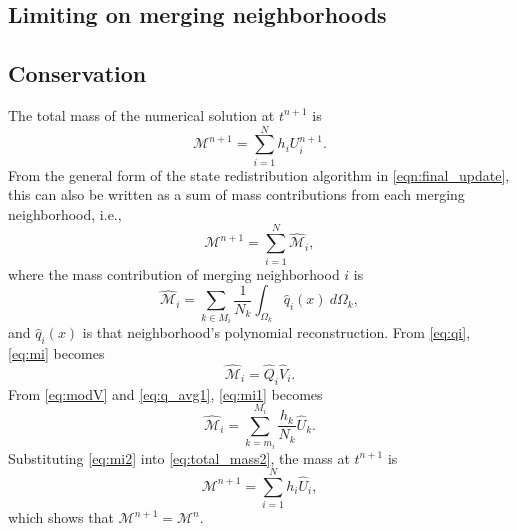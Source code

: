 \subsection{Limiting on merging neighborhoods}


\subsection{Conservation}\label{sec:cons}
The total mass of the numerical solution at $t^{n+1}$ is
\begin{equation}\label{eq:total_mass}
\mathcal{M}^{n+1} = \sum^N_{i=1} h_i U^{n+1}_i.
\end{equation}
From the general form of the state redistribution algorithm 
in \eqref{eqn:final_update}, 
this can also be written as a sum of mass contributions from each 
merging neighborhood, i.e.,
\begin{equation}\label{eq:total_mass2}
\mathcal{M}^{n+1} = \sum^N_{i=1} \hat{\mathcal{M}}_i,
\end{equation}
where the mass contribution of merging neighborhood $i$ is
\begin{equation}\label{eq:mi}
\hat{\mathcal{M}}_i = \sum_{k \in M_i}\frac{1}{N_k} \int_{\Omega_k}\hat q_i(x) ~d\Omega_k,
\end{equation}
and $\hat q_i(x)$ is that neighborhood's polynomial reconstruction.  
From \eqref{eq:qi}, \eqref{eq:mi} becomes
\begin{equation}\label{eq:mi1}
\hat{\mathcal{M}}_i = \hat Q_i \hat V_i.
\end{equation}
From \eqref{eq:modV} and \eqref{eq:q_avg1}, \eqref{eq:mi1} becomes
\begin{equation}\label{eq:mi2}
\hat{\mathcal{M}}_i = \sum^{M_i}_{k = m_i}\frac{h_k}{N_k} \hat U_{k}.
\end{equation}
Substituting \eqref{eq:mi2} into \eqref{eq:total_mass2}, the mass at $t^{n+1}$ is
$$
\mathcal{M}^{n+1} = \sum^{N}_{i=1} h_i \hat U_i,
$$
which shows that $\mathcal{M}^{n+1}  = \mathcal{M}^{n} $.

	
